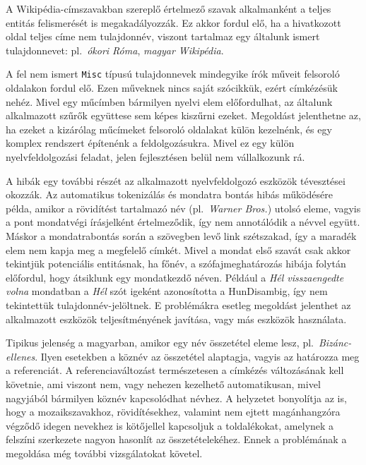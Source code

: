 \documentclass{llncs}
\begin{document}
A Wikipédia-címszavakban szereplő értelmező szavak alkalmanként a teljes entitás
felismerését is megakadályozzák. Ez akkor fordul elő, ha a hivatkozott oldal
teljes címe nem tulajdonnév, viszont tartalmaz egy általunk ismert tulajdonnevet:
pl.~\textit{ókori Róma}, \textit{magyar Wikipédia}. 

A fel nem ismert \texttt{Misc} típusú tulajdonnevek mindegyike
írók műveit felsoroló oldalakon fordul elő. Ezen műveknek nincs saját szócikkük,
ezért címkézésük nehéz. Mivel egy műcímben bármilyen nyelvi elem előfordulhat, az általunk alkalmazott szűrők együttese sem képes kiszűrni ezeket. Megoldást jelenthetne az, ha ezeket a kizárólag műcímeket felsoroló oldalakat külön kezelnénk, és egy komplex rendszert építenénk a feldolgozásukra. Mivel ez egy külön nyelvfeldolgozási feladat, jelen fejlesztésen belül nem vállalkozunk rá. %

A hibák egy további részét az alkalmazott nyelvfeldolgozó eszközök tévesztései okozzák.
Az automatikus tokenizálás és mondatra bontás hibás működésére példa, amikor a
rövidítést tartalmazó név (pl.~\textit{Warner Bros.}) utolsó eleme, vagyis a pont
mondatvégi írásjelként értelmeződik, így nem annotálódik a névvel együtt. Máskor
a mondatrabontás során a szövegben levő link szétszakad, így a maradék elem nem
kapja meg a megfelelő címkét. Mivel a mondat első szavát csak akkor tekintjük
potenciális entitásnak, ha főnév, a szófajmeghatározás hibája folytán előfordul,
hogy átsiklunk egy mondatkezdő néven. Például a \textit{Hél visszaengedte volna}
mondatban a \textit{Hél} szót igeként azonosította a HunDisambig, így nem
tekintettük tulajdonnév-jelöltnek. E problémákra esetleg megoldást jelenthet az
alkalmazott eszközök teljesítményének javítása, vagy más eszközök használata.

Tipikus jelenség a magyarban, amikor egy név összetétel eleme lesz,
pl.~\textit{Bizánc-ellenes}. Ilyen esetekben a köznév az összetétel alaptagja,
vagyis az határozza meg a referenciát. A referenciaváltozást természetesen a
címkézés változásának kell követnie, ami viszont nem, vagy nehezen kezelhető
automatikusan, mivel nagyjából bármilyen köznév kapcsolódhat névhez. A helyzetet
bonyolítja az is, hogy a mozaikszavakhoz, rövidítésekhez, valamint nem ejtett
magánhangzóra végződő idegen nevekhez is kötőjellel kapcsoljuk a toldalékokat,
amelynek a felszíni szerkezete nagyon hasonlít az összetételekéhez. Ennek a
problémának a megoldása még további vizsgálatokat követel. 
\end{document}
